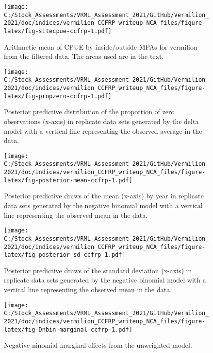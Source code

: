 \documentclass[
]{article}
\begin{document}
\begin{figure}
\centering
\texttt{[image: C:/Stock\_Assessments/VRML\_Assessment\_2021/GitHub/Vermilion\_2021/doc/indices/vermilion\_CCFRP\_writeup\_NCA\_files/figure-latex/fig-sitecpue-ccfrp-1.pdf]}
\caption{\label{fig:fig-sitecpue-ccfrp}Arithmetic mean of CPUE by inside/outside MPAs for vermilion from the filtered data. The areas used are in the text.}
\end{figure}

\begin{figure}
\centering
\texttt{[image: C:/Stock\_Assessments/VRML\_Assessment\_2021/GitHub/Vermilion\_2021/doc/indices/vermilion\_CCFRP\_writeup\_NCA\_files/figure-latex/fig-propzero-ccfrp-1.pdf]}
\caption{\label{fig:fig-propzero-ccfrp}Posterior predictive distribution of the proportion of zero observations (x-axis) in replicate data sets generated by the delta model with a vertical line representing the observed average in the data.}
\end{figure}

\begin{figure}
\centering
\texttt{[image: C:/Stock\_Assessments/VRML\_Assessment\_2021/GitHub/Vermilion\_2021/doc/indices/vermilion\_CCFRP\_writeup\_NCA\_files/figure-latex/fig-posterior-mean-ccfrp-1.pdf]}
\caption{\label{fig:fig-posterior-mean-ccfrp}Posterior predictive draws of the mean (x-axis) by year in replicate data sets generated by the negative binomial model with a vertical line representing the observed mean in the data.}
\end{figure}

\begin{figure}
\centering
\texttt{[image: C:/Stock\_Assessments/VRML\_Assessment\_2021/GitHub/Vermilion\_2021/doc/indices/vermilion\_CCFRP\_writeup\_NCA\_files/figure-latex/fig-posterior-sd-ccfrp-1.pdf]}
\caption{\label{fig:fig-posterior-sd-ccfrp}Posterior predictive draws of the standard deviation (x-axis) in replicate data sets generated by the negative binomial model with a vertical line representing the observed mean in the data.}
\end{figure}

\begin{figure}
\centering
\texttt{[image: C:/Stock\_Assessments/VRML\_Assessment\_2021/GitHub/Vermilion\_2021/doc/indices/vermilion\_CCFRP\_writeup\_NCA\_files/figure-latex/fig-Dnbin-marginal-ccfrp-1.pdf]}
\caption{\label{fig:fig-Dnbin-marginal-ccfrp}Negative ninomial marginal effects from the unweighted model.}
\end{figure}
\end{document}

